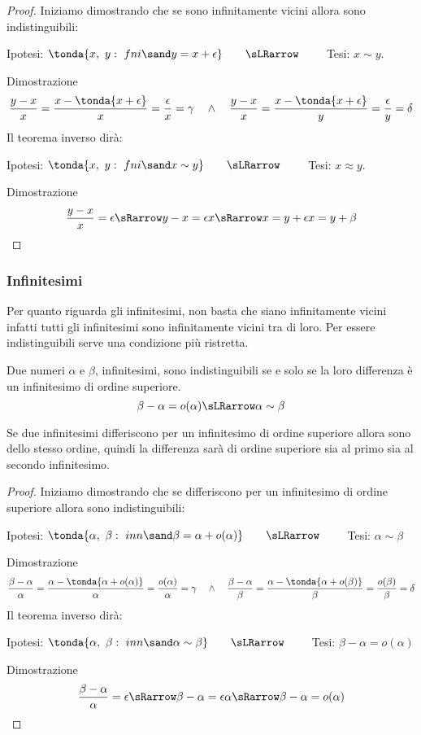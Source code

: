 \begin{proof}
Iniziamo dimostrando che se sono infinitamente vicini allora sono 
indistinguibili:
\begin{center}
Ipotesi: \(\tonda{x,~y:\ fni \sand y = x+\epsilon} \qquad \sLRarrow \qquad\) 
Tesi: \(x \sim y\).
\end{center}
Dimostrazione
\[\frac{y-x}{x}=\frac{x-\tonda{x+\epsilon}}{x} = 
\frac{\epsilon}{x}= \gamma \quad \wedge \quad 
\frac{y-x}{x}=\frac{x-\tonda{x+\epsilon}}{y} = 
\frac{\epsilon}{y}= \delta
\]
Il teorema inverso dirà:
\begin{center}
Ipotesi: \(\tonda{x,~y:\ fni \sand x \sim y} \qquad \sLRarrow \qquad\) 
Tesi: \(x \approx y\).
\end{center}
Dimostrazione
\[\frac{y-x}{x} = \epsilon
\sRarrow y-x=\epsilon x \sRarrow x=y+\epsilon x=y+\beta 
\]
\end{proof}

\subsubsection{Infinitesimi}
\label{subsubsec:insnum_infinitesimi}

Per quanto riguarda gli infinitesimi, non basta che siano infinitamente 
vicini infatti tutti gli infinitesimi sono infinitamente vicini tra di loro.
Per essere indistinguibili serve una condizione più ristretta.

\begin{teorema}
Due numeri \(\alpha\) e \(\beta\), infinitesimi, 
sono indistinguibili se e solo se la loro differenza è un infinitesimo di 
ordine superiore.
\[\beta-\alpha = o(\alpha) \sLRarrow \alpha \sim \beta\] 
\end{teorema}

\begin{osservazione}
 Se due infinitesimi differiscono per un infinitesimo di ordine superiore 
allora sono dello stesso ordine, quindi la differenza sarà di ordine 
superiore sia al primo sia al secondo infinitesimo.
\end{osservazione}

\begin{proof}
Iniziamo dimostrando che se differiscono per un infinitesimo di ordine 
superiore allora sono indistinguibili:
\begin{center}
Ipotesi: \(\tonda{\alpha,~\beta:\ inn \sand \beta = \alpha +o(\alpha)}
\qquad \sLRarrow\qquad\) 
Tesi: \(\alpha \sim \beta\)
\end{center}
Dimostrazione
\[\frac{\beta-\alpha}{\alpha}=
\frac{\alpha-\tonda{\alpha +o(\alpha)}}{\alpha} = 
\frac{o(\alpha)}{\alpha}= \gamma \quad \wedge \quad 
\frac{\beta-\alpha}{\beta}=
\frac{\alpha-\tonda{\alpha +o(\beta)}}{\beta} = 
\frac{o(\beta)}{\beta}= \delta
\]
Il teorema inverso dirà:
\begin{center}
Ipotesi: \(\tonda{\alpha,~\beta:\ inn \sand \alpha \sim \beta}
\qquad \sLRarrow \qquad\) 
Tesi: \(\beta-\alpha = o(\alpha)\)
\end{center}
Dimostrazione
\[\frac{\beta - \alpha}{\alpha} = \epsilon \sRarrow 
\beta - \alpha =\epsilon \alpha \sRarrow 
\beta - \alpha = o(\alpha)
\]
\end{proof}

